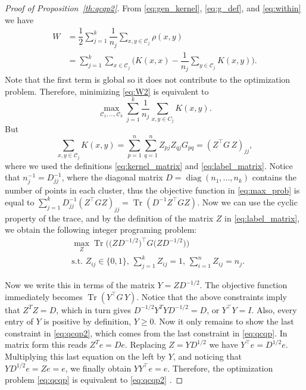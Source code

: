\documentclass[twoside]{article}
\DeclareMathOperator{\diag}{diag}
\DeclareMathOperator{\Tr}{Tr}
\newcommand\kk{K}
\newcommand\C{{\mathcal{C}}}
\newcommand\e{e}
\begin{document}
\begin{proof}[Proof of Proposition~\ref{th:qcqp2}]
From 
\eqref{eq:gen_kernel},
\eqref{eq:g_def}, and
\eqref{eq:within}
we have
\begin{equation}
\label{eq:W2}
\begin{split}
W
&= \dfrac{1}{2} \sum_{j=1}^k \dfrac{1}{n_j} \sum_{x,y \in \C_j} \rho(x,y) \\
&= \sum_{j=1}^k \sum_{x \in \C_j}  \bigg(
\kk(x,x) - \dfrac{1}{n_j} \sum_{y \in \C_j} \kk(x,y) \bigg).
\end{split}
\end{equation}
Note that the first term is global so it does not contribute to the 
optimization problem.
Therefore, minimizing \eqref{eq:W2} is equivalent to
\begin{equation}
\label{eq:max_prob}
\max_{ \C_1,\dotsc,\C_k } 
\sum_{j=1}^k \dfrac{1}{n_j} \sum_{x,y\in C_j} \kk(x,y) .
\end{equation}
But 
\begin{equation}
\sum_{x, y \in \C_j} \kk(x, y) =
\sum_{p=1}^{n} \sum_{q=1}^{n} Z_{pj} Z_{qj} G_{pq} = 
(Z^\top G \, Z)_{jj},
\end{equation}
where we used the definitions \eqref{eq:kernel_matrix} and
\eqref{eq:label_matrix}. 
Notice that $n_j^{-1} = D^{-1}_{jj}$, where the diagonal matrix $D = 
\diag(n_1,\dotsc,n_k)$ contains the number of points in each cluster, 
thus the objective function in 
\eqref{eq:max_prob} is equal to $\sum_{j=1}^k D^{-1}_{jj} 
\left( Z^\top G Z \right)_{jj} = \Tr \left( D^{-1} Z^\top G Z \right)$. 
Now we can
use the cyclic property
of the trace, and by the  definition of the matrix $Z$
in \eqref{eq:label_matrix}, we obtain the following integer
programing problem:
\begin{equation}\label{eq:qcqp}
\begin{split}
&\max_{Z} \Tr\Big( \big( Z D^{-1/2}\big)^\top G 
\big( ZD^{-1/2} \big) 
\Big) \\
&\mbox{s.t. $Z_{ij} \in \{0,1\}$, $\sum_{j=1}^k Z_{ij} = 1$, 
$\sum_{i=1}^n Z_{ij} = n_j$.}
\end{split}
\end{equation}

Now we write this in terms of the matrix $Y = Z D^{-1/2}$.
The objective function immediately becomes
$\Tr\left( Y^\top G \, Y\right)$. Notice that the above constraints
imply that $Z^T Z = D$, which in turn gives
$D^{-1/2} Y^T Y D^{-1/2} = D$, or $Y^\top Y = I$. 
Also, every entry of $Y$ is positive by definition,
$Y \ge 0$. Now it only remains to show the last 
constraint in \eqref{eq:qcqp2}, which comes from the last
constraint in \eqref{eq:qcqp}. In matrix form this reads
$Z^T \e = D \e$. Replacing $Z=YD^{1/2}$ we have
$Y^\top \e = D^{1/2} \e$. Multiplying this last equation
on the left by $Y$, and noticing
that $Y D^{1/2} \e = Z \e = \e$, we finally obtain
$Y Y^\top \e = \e$. Therefore, the optimization 
problem \eqref{eq:qcqp} is equivalent
to \eqref{eq:qcqp2} .
\end{proof}
\end{document}

